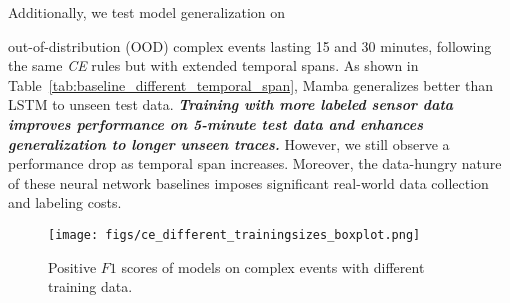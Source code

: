 Additionally, we test model generalization on {out-of-distribution (OOD) complex events lasting 15 and 30 minutes, following the same \emph{CE} rules but with extended temporal spans. As shown in Table~\ref{tab:baseline_different_temporal_span}, Mamba generalizes better than LSTM to unseen test data. \emph{\textbf{Training with more labeled sensor data improves performance on 5-minute test data and enhances generalization to longer unseen traces.}} However, we still observe a performance drop as temporal span increases. Moreover, the data-hungry nature of these neural network baselines imposes significant real-world data collection and labeling costs.









\begin{figure}[t]
    \centering
        \setlength{\abovecaptionskip}{0.cm}
    \setlength{\belowcaptionskip}{0.cm}
\texttt{[image: figs/ce\_different\_trainingsizes\_boxplot.png]}
    \caption{Positive $F1$ scores of models on complex events with different training data.}
    \label{fig:ce_different_trainingsizes_boxplot}
    \vspace{-1em}
\end{figure}


}
